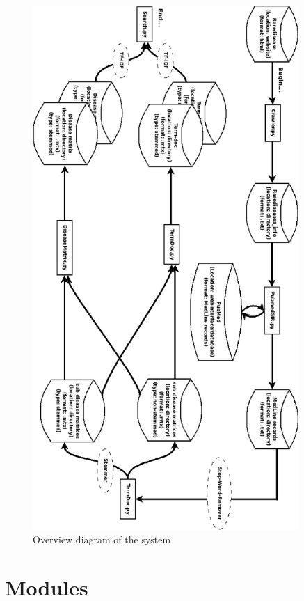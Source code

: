 \begin{figure}[h!]
        \begin{center}
          \includegraphics[width=0.9\textwidth]{diagrammer/system_overview_rotate.png}
        \end{center}
        \caption{Overview diagram of the system}
        \label{OverviewDiagram}
\end{figure}


\section{Modules}

